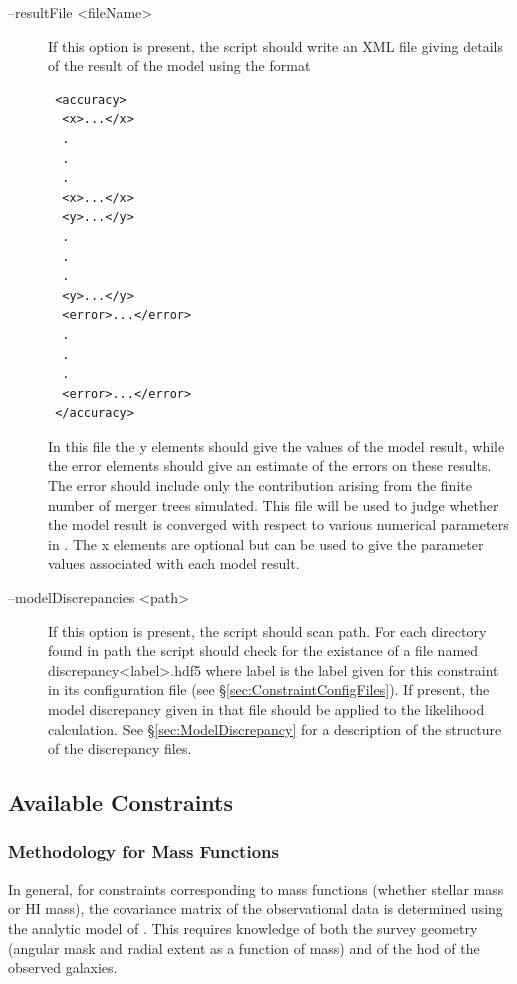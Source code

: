 \begin{description}
 \item [{\normalfont \ttfamily --resultFile <fileName>}] If this option is present, the script should write an XML file giving details of the result of the model using the format
\begin{verbatim}
 <accuracy>
  <x>...</x>
  .
  .
  .
  <x>...</x>
  <y>...</y>
  .
  .
  .
  <y>...</y>
  <error>...</error>
  .
  .
  .
  <error>...</error>
 </accuracy>
\end{verbatim}
In this file the {\normalfont \ttfamily y} elements should give the values of the model result, while the {\normalfont \ttfamily error} elements should give an estimate of the errors on these results. The error should include only the contribution arising from the finite number of merger trees simulated. This file will be used to judge whether the model result is converged with respect to various numerical parameters in \glc. The {\normalfont \ttfamily x} elements are optional but can be used to give the parameter values associated with each model result.
 \item [{\normalfont \ttfamily --modelDiscrepancies <path>}] If this option is present, the script should scan {\normalfont \ttfamily path}. For each directory found in {\normalfont \ttfamily path} the script should check for the existance of a file named {\normalfont \ttfamily discrepancy<label>.hdf5} where {\normalfont \ttfamily label} is the label given for this constraint in its configuration file (see \S\ref{sec:ConstraintConfigFiles}). If present, the model discrepancy given in that file should be applied to the likelihood calculation. See \S\ref{sec:ModelDiscrepancy} for a description of the structure of the discrepancy files.
\end{description}

\subsection{Available Constraints}

\subsubsection{Methodology for Mass Functions}

In general, for constraints corresponding to mass functions (whether stellar mass or HI mass), the covariance matrix of the observational data is determined using the analytic model of \cite{smith_how_2012}. This requires knowledge of both the survey geometry (angular mask and radial extent as a function of mass) and of the \gls{hod} of the observed galaxies.

